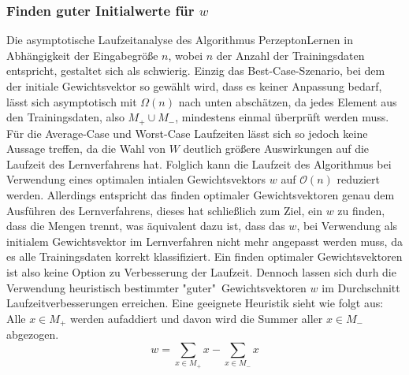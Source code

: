 \documentclass[a4paper]{scrartcl}
\begin{document}
\begin{multicols}{2}
                    \subsubsection{Finden guter Initialwerte für $w$}
                    Die asymptotische Laufzeitanalyse des Algorithmus PerzeptonLernen in Abhängigkeit der Eingabegröße $n$, wobei $n$ der Anzahl der Trainingsdaten entspricht, gestaltet sich als schwierig. Einzig das Best-Case-Szenario, bei dem der initiale Gewichtsvektor so gewählt wird, dass es keiner Anpassung bedarf, lässt sich asymptotisch mit $\Omega(n)$ nach unten abschätzen, da jedes Element aus den Trainingsdaten, also $M_+ \cup M_-$, mindestens einmal überprüft werden muss. Für die Average-Case und Worst-Case Laufzeiten lässt sich so jedoch keine Aussage treffen, da die Wahl von $W$ deutlich größere Auswirkungen auf die Laufzeit des Lernverfahrens hat.
                    Folglich kann die Laufzeit des Algorithmus bei Verwendung eines optimalen intialen Gewichtsvektors $w$ auf $\mathcal{O}(n)$ reduziert werden. Allerdings entspricht das finden optimaler Gewichtsvektoren genau dem Ausführen des Lernverfahrens, dieses hat schließlich zum Ziel, ein $w$ zu finden, dass die Mengen trennt, was äquivalent dazu ist, dass das $w$, bei Verwendung als initialem Gewichtsvektor im Lernverfahren nicht mehr angepasst werden muss, da es alle Trainingsdaten korrekt klassifiziert.
                    Ein finden optimaler Gewichtsvektoren ist also keine Option zu Verbesserung der Laufzeit.
                    \newline
                    Dennoch lassen sich durh die Verwendung heuristisch bestimmter "guter"\  Gewichtsvektoren $w$ im Durchschnitt Laufzeitverbesserungen erreichen.
                    Eine geeignete Heuristik sieht wie folgt aus: 
                    \newline
                    Alle $x\in M_+$ werden aufaddiert und davon wird die Summer aller $x\in M_-$ abgezogen.
                    $$
                        w = \sum_{x \in M_+}x - \sum_{x \in M_-}x
                    $$


\end{multicols}
\end{document}
